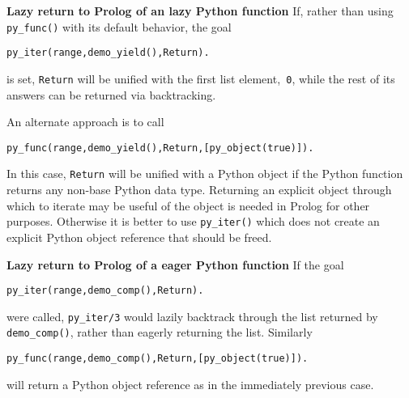 \begin{example}
\noindent
{\bf Lazy return to Prolog of an lazy Python function} If, rather than
using {\tt py\_func()} with its default behavior, the goal

{\tt py\_iter(range,demo\_yield(),Return).}

\noindent
is set, {\tt Return} will be unified with the first list element,{\tt
  0}, while the rest of its answers can be returned via backtracking.

An alternate approach is to call 

{\tt py\_func(range,demo\_yield(),Return,[py\_object(true)]).}

\noindent In this case, {\tt Return} will be unified with a Python
object if the Python function returns any non-base Python data type.
Returning an explicit object through which to iterate may be useful of
the object is needed in Prolog for other purposes.  Otherwise it is
better to use {\tt py\_iter()} which does not create an explicit Python
object reference that should be freed.

\noindent
{\bf Lazy return to Prolog of a eager Python function} 
If the goal

{\tt py\_iter(range,demo\_comp(),Return).}

\noindent
were called, {\tt py\_iter/3} would lazily backtrack through the list
returned by {\tt demo\_comp()}, rather than eagerly returning the
list.  Similarly

{\tt py\_func(range,demo\_comp(),Return,[py\_object(true)]).}

\noindent
will return a Python object reference as in the immediately previous
case.  
\end{example}

%
%

%
%

